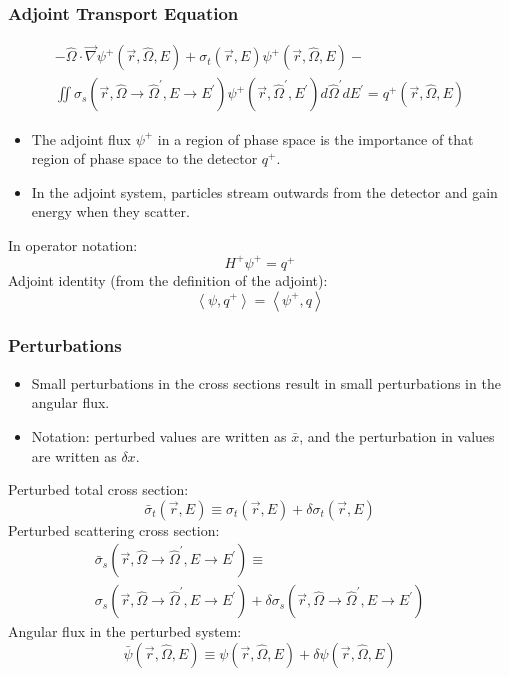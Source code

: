 \documentclass[t]{beamer}
\begin{document}
\begin{frame}
  \frametitle{Adjoint Transport Equation}
  \begin{multline}
    -\hat{\Omega}\cdot\vec{\nabla}\psi^+\left(\vec{r},\hat{\Omega},E\right) +
    \sigma_t\left(\vec{r},E\right)\psi^+\left(\vec{r},\hat{\Omega},E\right) - \\
    \iint\sigma_s\left(\vec{r},\hat{\Omega}\rightarrow\hat{\Omega}^\prime,E\rightarrow E^\prime\right)\psi^+\left(\vec{r},\hat{\Omega}^\prime,E^\prime\right)d\hat{\Omega}^\prime dE^\prime =
    q^+\left(\vec{r},\hat{\Omega},E\right)
  \end{multline}
  \begin{itemize}
    \item The adjoint flux $\psi^+$ in a region of phase space is the importance
          of that region of phase space to the detector $q^+$.
    \item In the adjoint system, particles stream outwards from the detector and
          gain energy when they scatter.
  \end{itemize}
  In operator notation:
  \begin{equation}
    H^+\psi^+ = q^+
  \end{equation}
  Adjoint identity (from the definition of the adjoint):
  \begin{equation}
    \left<\psi,q^+\right> = \left<\psi^+,q\right>
  \end{equation}
\end{frame}

\begin{frame}
  \frametitle{Perturbations}
  \begin{itemize}
    \item Small perturbations in the cross sections result in small
          perturbations in the angular flux.
    \item Notation: perturbed values are written as $\bar{x}$, and
          the perturbation in values are written as $\delta x$.
  \end{itemize}
  Perturbed total cross section:
  \begin{equation}
    \bar{\sigma}_t\left(\vec{r},E\right) \equiv
    \sigma_t\left(\vec{r},E\right) +
    \delta\sigma_t\left(\vec{r},E\right)
  \end{equation}
  Perturbed scattering cross section:
  \begin{multline}
    \bar{\sigma}_s\left(\vec{r},\hat{\Omega}\rightarrow\hat{\Omega}^\prime,E\rightarrow E^\prime\right) \equiv \\
    \sigma_s\left(\vec{r},\hat{\Omega}\rightarrow\hat{\Omega}^\prime,E\rightarrow E^\prime\right) +
    \delta\sigma_s\left(\vec{r},\hat{\Omega}\rightarrow\hat{\Omega}^\prime,E\rightarrow E^\prime\right)
  \end{multline}
  Angular flux in the perturbed system:
  \begin{equation}
    \bar{\psi}\left(\vec{r},\hat{\Omega},E\right) \equiv
    \psi\left(\vec{r},\hat{\Omega},E\right) +
    \delta\psi\left(\vec{r},\hat{\Omega},E\right)
  \end{equation}
\end{frame}
\end{document}
